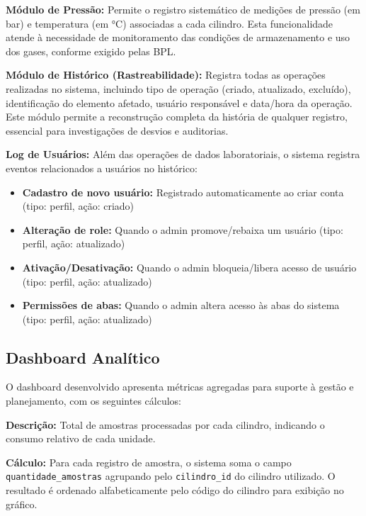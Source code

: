 \documentclass[12pt,a4paper]{article}
\providecommand\关键字[1]{\textbf{#1}}
\begin{document}
\textbf{Módulo de Pressão:} Permite o registro sistemático de medições de pressão (em bar) e temperatura (em °C) associadas a cada cilindro. Esta funcionalidade atende à necessidade de monitoramento das condições de armazenamento e uso dos gases, conforme exigido pelas BPL.

\textbf{Módulo de Histórico (Rastreabilidade):} Registra todas as operações realizadas no sistema, incluindo tipo de operação (criado, atualizado, excluído), identificação do elemento afetado, usuário responsável e data/hora da operação. Este módulo permite a reconstrução completa da história de qualquer registro, essencial para investigações de desvios e auditorias.

\textbf{Log de Usuários:} Além das operações de dados laboratoriais, o sistema registra eventos relacionados a usuários no histórico:
\begin{itemize}
\item \textbf{Cadastro de novo usuário:} Registrado automaticamente ao criar conta (tipo: perfil, ação: criado)
\item \textbf{Alteração de role:} Quando o admin promove/rebaixa um usuário (tipo: perfil, ação: atualizado)
\item \textbf{Ativação/Desativação:} Quando o admin bloqueia/libera acesso de usuário (tipo: perfil, ação: atualizado)
\item \textbf{Permissões de abas:} Quando o admin altera acesso às abas do sistema (tipo: perfil, ação: atualizado)
\end{itemize}

\subsection{Dashboard Analítico}

O dashboard desenvolvido apresenta métricas agregadas para suporte à gestão e planejamento, com os seguintes cálculos:


\textbf{Descrição:} Total de amostras processadas por cada cilindro, indicando o consumo relativo de cada unidade.

\textbf{Cálculo:} Para cada registro de amostra, o sistema soma o campo \texttt{quantidade\_amostras} agrupando pelo \texttt{cilindro\_id} do cilindro utilizado. O resultado é ordenado alfabeticamente pelo código do cilindro para exibição no gráfico.

\end{document}
